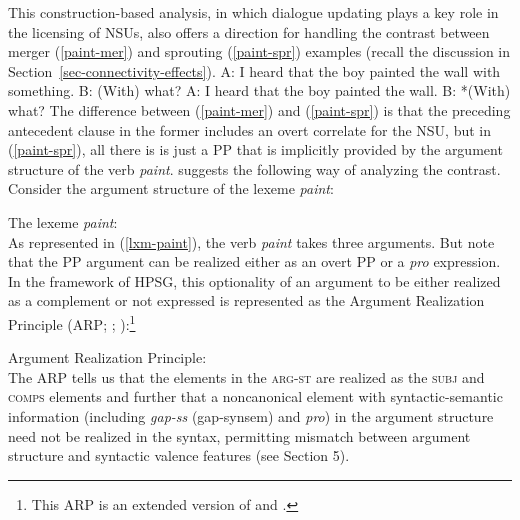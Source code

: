 This construction-based analysis, in which dialogue updating plays
a key role in the licensing of NSUs, also offers a direction
for handling the contrast between merger (\ref{paint-mer}) and sprouting (\ref{paint-spr}) examples (recall the discussion in Section~\ref{sec-connectivity-effects}). %
%
\eal
\ex A: I heard that the boy painted the wall with something. B: (With) what?  
\label{paint-mer}
\ex A: I heard that the boy painted the wall. B: *(With) what? \label{paint-spr}
\zl
%
The difference between (\ref{paint-mer}) and (\ref{paint-spr})  is that the preceding antecedent clause in the
former includes an overt correlate for the NSU, but in (\ref{paint-spr}), 
all there is is just a PP that is implicitly provided
by the argument structure 
of the verb \textit{paint}.
%
\citet{Kim2015} suggests the following way of analyzing the contrast. Consider the argument structure of the lexeme \textit{paint}:

\ea
\label{lxm-paint}
The lexeme \textit{paint}:\\
\z
%
%
As represented in (\ref{lxm-paint}), the verb \emph{paint}
takes three arguments. But
note that the PP argument can be realized
either as an overt PP or a \textit{pro} expression. In the framework of HPSG, this optionality of an argument to be either realized as a complement or not expressed is represented as the Argument Realization Principle  (ARP; \citealt{ginzburg-miller-ellipsis-handbook}; \crossrefchapteralt[\page \pageref{page-argument-realization-principle}]{properties}):\footnote{This
ARP is an extended version of \citet[171]{Ginzburg:Sag:2000} and \citet[11]{Bouma:Malouf:Sag:01}.}
%

\ea
\label{arp}
Argument Realization Principle:\\
 \impl
{}
\z
The ARP tells us that the elements in the \textsc{arg-st} are realized as the \textsc{subj} and
\textsc{comps} elements and further that a noncanonical  element with syntactic-semantic information (including \textit{gap-ss} (gap-synsem) and \textit{pro}) in the argument structure need not be realized in the syntax, permitting mismatch between argument structure and syntactic valence features (see Section 5). 

